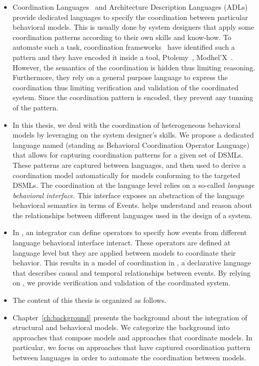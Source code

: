 \begin{itemize}
	
	\item Coordination Languages~\cite{coordsignibib} and Architecture Description Languages (ADLs)~\cite{frameadlsbib} provide dedicated languages to specify the coordination between particular behavioral models. This is usually done by system designers that apply some coordination patterns according to their own skills and know-how. To automate such a task, coordination frameworks~\cite{ptoleframebib,modhelxbib} have identified such a pattern and they have encoded it inside a tool, \eg Ptolemy~\cite{ptoleframebib}, Modhel'X~\cite{modhelxbib}. However, the semantics of the coordination is hidden thus limiting reasoning. Furthermore, they rely on a general purpose language to express the coordination thus limiting verification and validation of the coordinated system. Since the coordination pattern is encoded, they prevent any tunning of the pattern.   
	
\item In this thesis, we deal with the coordination of heterogeneous behavioral models by leveraging on the system designer's skills. We propose a dedicated language named \bcool (standing as Behavioral Coordination Operator Language) that allows for capturing coordination patterns for a given set of DSMLs. These patterns are captured between languages, and then used to derive a coordination model automatically for models conforming to the targeted DSMLs. The coordination at the language level relies on a so-called \emph{language behavioral interface}. This interface exposes an abstraction of the language behavioral semantics in terms of Events. \bcool helps understand and reason about the relationships between different languages used in the design of a system.  

\item In \bcool, an integrator can define operators to specify how events from different language behavioral interface interact. These operators are defined at language level but they are applied between models to coordinate their behavior. This results in a model of coordination in \ccsl, a declarative language that describes causal and temporal relationships between events. By relying on \ccsl, we provide verification and validation of the coordinated system.    

\item The content of this thesis is organized as follows. 

\item Chapter~\ref{ch:background} presents the background about the integration of structural and behavioral models. We categorize the background into approaches that compose models and approaches that coordinate models. In particular, we focus on approaches that have captured coordination pattern between languages in order to automate the coordination between models.   


\end{itemize}
